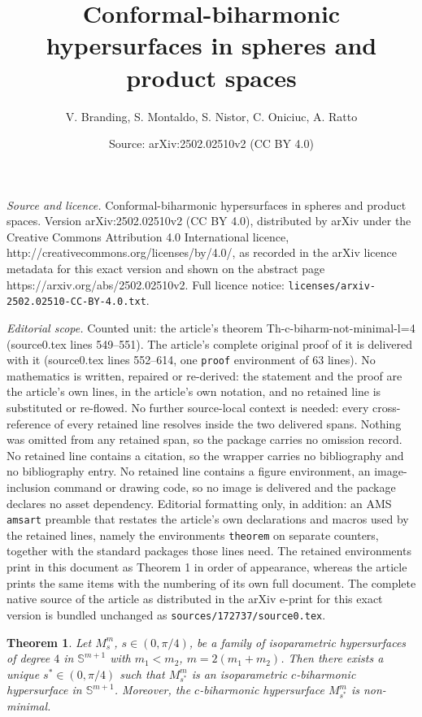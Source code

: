 \documentclass[10pt,a4paper]{amsart}
\title{Conformal-biharmonic hypersurfaces in spheres and product spaces}
\author{V. Branding, S. Montaldo, S. Nistor, C. Oniciuc, A. Ratto}
\date{Source: arXiv:2502.02510v2 (CC BY 4.0)}
\newtheorem{theorem}{Theorem}
\def \s{{\mathbb S}}
\begin{document}
\maketitle

\noindent\emph{Source and licence.} Conformal-biharmonic hypersurfaces in spheres and product spaces. Version arXiv:2502.02510v2 (CC BY 4.0), distributed by arXiv under the Creative Commons Attribution 4.0 International licence, http://creativecommons.org/licenses/by/4.0/, as recorded in the arXiv licence metadata for this exact version and shown on the abstract page https://arxiv.org/abs/2502.02510v2. Full licence notice: \texttt{licenses/arxiv-2502.02510-CC-BY-4.0.txt}.\par\smallskip

\noindent\textit{Editorial scope.} Counted unit: the article's theorem Th-c-biharm-not-minimal-l=4 (source0.tex lines 549--551). The article's complete original proof of it is delivered with it (source0.tex lines 552--614, one \texttt{proof} environment of 63 lines). No mathematics is written, repaired or re-derived: the statement and the proof are the article's own lines, in the article's own notation, and no retained line is substituted or re-flowed.  No further source-local context is needed: every cross-reference of every retained line resolves inside the two delivered spans.  Nothing was omitted from any retained span, so the package carries no omission record.  No retained line contains a citation, so the wrapper carries no bibliography and no bibliography entry.  No retained line contains a figure environment, an image-inclusion command or drawing code, so no image is delivered and the package declares no asset dependency.  Editorial formatting only, in addition: an AMS \texttt{amsart} preamble that restates the article's own declarations and macros used by the retained lines, namely the environments \texttt{theorem} on separate counters, together with the standard packages those lines need.  The retained environments print in this document as Theorem 1 in order of appearance, whereas the article prints the same items with the numbering of its own full document.  The complete native source of the article as distributed in the arXiv e-print for this exact version is bundled unchanged as \texttt{sources/172737/source0.tex}.
\begin{theorem}\label{Th-c-biharm-not-minimal-l=4}
Let $M_s^m$, $s\in(0,\pi/4)$, be a family of isoparametric hypersurfaces of degree $4$ in $\s^{m+1}$ with $m_1<m_2$, $m=2(m_1+m_2)$. Then there exists a unique $s^*\in(0,\pi/4)$ such that $M_{s^*}^m$ is an isoparametric $c$-biharmonic hypersurface in $\s^{m+1}$. Moreover, the $c$-biharmonic hypersurface $M_{s^*}^m$ is non-minimal.
\end{theorem}
\end{document}
